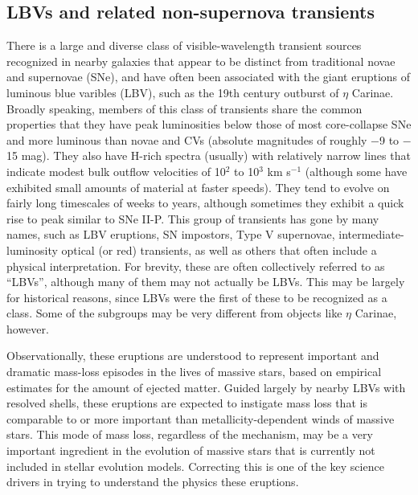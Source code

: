 %
%

\subsection{LBVs and related non-supernova transients}


There is a large and diverse class of visible-wavelength transient
sources recognized in nearby galaxies that appear to be distinct from
traditional novae and supernovae (SNe), and have often been associated with
the giant eruptions of luminous blue varibles (LBV), such as the 19th
century outburst of $\eta$ Carinae.  Broadly speaking, members of this
class of transients share the common properties that they have peak
luminosities below those of most core-collapse SNe and more luminous
than novae and CVs (absolute magnitudes of roughly $-$9 to $-$15 mag).
They also have H-rich spectra (usually) with relatively narrow lines
that indicate modest bulk outflow velocities of 10$^2$ to 10$^3$ km
s$^{-1}$ (although some have exhibited small amounts of material at
faster speeds).  They tend to evolve on fairly long timescales of
weeks to years, although sometimes they exhibit a quick rise to peak
similar to SNe II-P. This group of transients has gone by many names,
such as LBV eruptions, SN impostors, Type V supernovae,
intermediate-luminosity optical (or red) transients, as well as others
that often include a physical interpretation.  For brevity, these are
often collectively referred to as ``LBVs'', although many of them may
not actually be LBVs. This may be largely for historical reasons,
since LBVs were the first of these to be recognized as a class.  Some
of the subgroups may be very different from objects like $\eta$
Carinae, however.

Observationally, these eruptions are understood to represent important
and dramatic mass-loss episodes in the lives of massive stars, based
on empirical estimates for the amount of ejected matter.  Guided
largely by nearby LBVs with resolved shells, these eruptions are
expected to instigate mass loss that is comparable to or more
important than metallicity-dependent winds of massive stars.  This
mode of mass loss, regardless of the mechanism, may be a very
important ingredient in the evolution of massive stars that is
currently not included in stellar evolution models.  Correcting this
is one of the key science drivers in trying to understand the physics
these eruptions.

